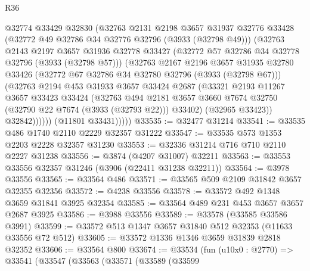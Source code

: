 \begin{lexlean}{R36}
\begin{coremodule}
                @32774
                @33429
                @32830
                (@32763
                  @2131
                  @2198
                  @3657
                  @31937
                  @32776
                  @33428
                  (@32772 @49 @32786 @34 @32776 @32796 (@3933 (@32798 @49)))
                  (@32763
                    @2143
                    @2197
                    @3657
                    @31936
                    @32778
                    @33427
                    (@32772 @57 @32786 @34 @32778 @32796 (@3933 (@32798 @57)))
                    (@32763
                      @2167
                      @2196
                      @3657
                      @31935
                      @32780
                      @33426
                      (@32772 @67 @32786 @34 @32780 @32796 (@3933 (@32798 @67)))
                      (@32763
                        @2194
                        @453
                        @31933
                        @3657
                        @33424
                        @2687
                        (@33321
                          @2193
                          @11267
                          @3657
                          @33423
                          @33424
                          (@32763
                            @494
                            @2181
                            @3657
                            @3660
                            @7674
                            @32750
                            (@32790 @22 @7674 (@3933 (@32793 @22)))
                            @33402)
                          (@32965 @33423))
                        @32842))))))
            (@11801 @33431)))))
@33535 := @32477 @31214
@33541 := @33535 @486 @1740 @2110 @2229 @32357 @31222
@33547 := @33535 @573 @1353 @2203 @2228 @32357 @31230
@33553 := @32336 @31214 @716 @710 @2110 @2227 @31238
@33556 := @3874 (@4207 @31007) @32211
@33563 := @33553 @33556 @32357 @31246 (@3906 (@22411 @31238 @32211))
@33564 := @3978 @33556
@33565 := @33564 @486
@33571 := @33565 @509 @2109 @31842 @3657 @32355 @32356
@33572 := @4238 @33556
@33578 := @33572 @492 @1348 @3659 @31841 @3925 @32354
@33585 := @33564 @489 @231 @453 @3657 @3657 @2687 @3925
@33586 := @3988 @33556
@33589 := @33578 (@33585 @33586 @3991)
@33599 := @33572 @513 @1347 @3657 @31840 @512 @32353 (@11633 @33556 @72 @512)
@33605 := @33572 @1336 @1346 @3659 @31839 @2818 @32352
@33606 := @33564 @800
@33674 := @33534
    (fun (u10x0 : @2770) =>
    @33541
      (@33547
        (@33563
          (@33571
            (@33589
              (@33599

\end{coremodule}
\end{lexlean}
